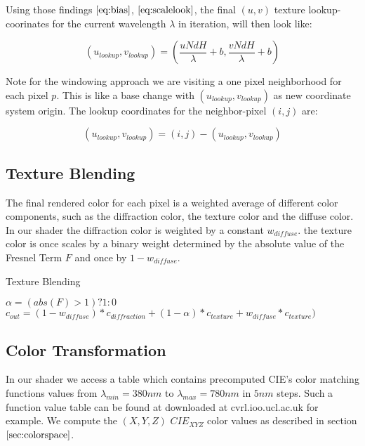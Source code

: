 Using those findings $\ref{eq:bias}$, $\ref{eq:scalelook}$, the final $(u,v)$ texture lookup-coorinates for the current wavelength $\lambda$ in iteration, will then look like:

\begin{equation}
  (u_{lookup}, v_{lookup}) = \left( \frac{u N dH}{\lambda} + b, \frac{v N dH}{\lambda} + b \right)
\label{eq:ublookup}
\end{equation}  

Note for the windowing approach we are visiting a one pixel neighborhood for each pixel $p$. 
This is like a base change with $(u_{lookup}, v_{lookup})$ as new coordinate system origin. The lookup coordinates for the neighbor-pixel $(i,j)$ are:

\begin{equation}
  (u_{lookup}, v_{lookup}) = (i,j)-(u_{lookup}, v_{lookup})
\label{eq:gaussianwindowlook}
\end{equation}

\subsection{Texture Blending}
The final rendered color for each pixel is a weighted average of different color components, such as the diffraction color, the texture color and the diffuse color. In our shader the diffraction color is weighted by a constant $w_{diffuse}$. the texture color is once scales by a binary weight determined by the absolute value of the Fresnel Term $F$ and once by $1-w_{diffuse}$. 

\begin{algorithm}[H]
  \caption{Texture Blending}
  \begin{algorithmic}
    \State $\alpha = (abs(F) > 1) ? 1 : 0$
    \State $c_{out} =(1-w_{diffuse})*c_{diffraction} + (1-\alpha)*c_{texture} + w_{diffuse}*c_{texture})$
  \end{algorithmic}
\end{algorithm}

\subsection{Color Transformation}
\label{subsec:colortransformations}

In our shader we access a table which contains precomputed CIE's color matching functions values from $\lambda_{min} = 380 nm$ to $\lambda_{max} = 780 nm$ in $5 nm$ steps. Such a function value table can be found at downloaded at cvrl.ioo.ucl.ac.uk for example. We compute the $(X,Y,Z)$ $CIE_{XYZ}$ color values as described in section $\ref{sec:colorspace}$. 


